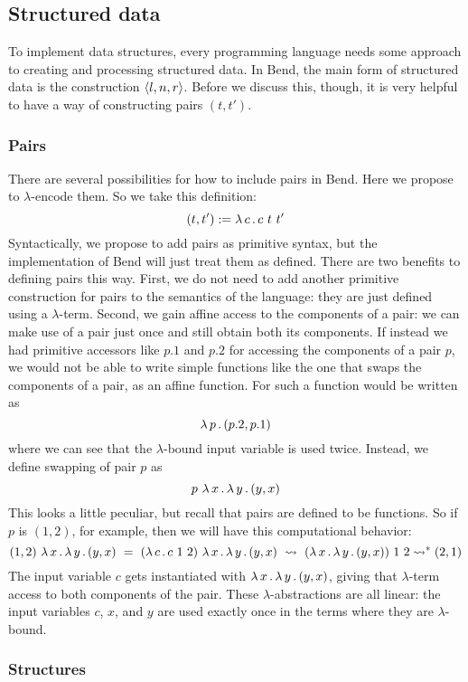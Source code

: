 \documentclass{article}
\begin{document}
\subsection{Structured data}

To implement data structures, every programming language needs some
approach to creating and processing structured data.  In Bend, the
main form of structured data is the construction $\langle l , n, r \rangle$.
Before we discuss this, though, it is very helpful to have a way of
constructing pairs $(t,t')$.

\subsubsection{Pairs}

There are several possibilities for how to include pairs in Bend.
Here we propose to $\lambda$-encode them.  So we take this definition:
\[
(t,t') := \lambda\, c\, .\, c\ t\ t'
\]
\noindent Syntactically, we propose to add pairs as primitive syntax,
but the implementation of Bend will just treat them as defined.  There
are two benefits to defining pairs this way.  First, we do not need to
add another primitive construction for pairs to the semantics of the
language: they are just defined using a $\lambda$-term.  Second, we
gain affine access to the components of a pair: we can make use of a
pair just once and still obtain both its components.  If instead we
had primitive accessors like $p.1$ and $p.2$ for accessing the
components of a pair $p$, we would not be able to write simple
functions like the one that swaps the components of a pair, as an
affine function.  For such a function would be written as
\[
\lambda\, p\, .\, (p.2,p.1)
\]
\noindent where we can see that the $\lambda$-bound input variable is used twice.
Instead, we define swapping of pair $p$ as
\[
p\ \lambda\, x\, .\, \lambda\, y\, .\, (y,x)
\]
\noindent This looks a little peculiar, but recall that pairs are defined to be functions.
So if $p$ is $(1,2)$, for example, then we will have this computational behavior:
\[
(1,2)\ \lam{x}{\lam{y}{(y,x)}} \ =\ (\lam{c}{c\ 1\ 2})\ \lam{x}{\lam{y}{(y,x)}}\ \leadsto\ (\lam{x}{\lam{y}{(y,x)}})\ 1\ 2 \leadsto^* (2,1)
\]
\noindent The input variable $c$ gets instantiated with
$\lambda\, x\, .\, \lambda\, y\, .\, (y,x)$, giving that $\lambda$-term access to both
components of the pair.  These $\lambda$-abstractions are all linear:
the input variables $c$, $x$, and $y$ are used exactly once in the
terms where they are $\lambda$-bound.

\subsubsection{Structures}
\end{document}
